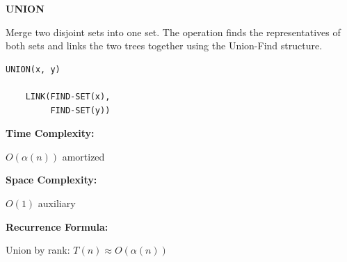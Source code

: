 \documentclass[a4paper,12pt]{article}
\begin{document}
\begin{tcolorbox}[
    colback=gray!30,
    colframe=black,
    boxrule=1pt,
    arc=0mm
]

\begin{tcolorbox}[
    colback=gray!10,
    colframe=black,
    arc=0mm
]
\centering
{\Huge\bfseries UNION}
\end{tcolorbox}


\begin{tcolorbox}[
    colback=gray!10,
    colframe=black,
    arc=0mm
]
\small
Merge two disjoint sets into one set.
The operation finds the representatives of both sets and links the two
trees together using the Union-Find structure.
\end{tcolorbox}


\begin{tcolorbox}[
    colback=black!5,
    colframe=black,
    arc=0mm,
    title=Pseudo-code
]
\tiny
\begin{lstlisting}
UNION(x, y)

    LINK(FIND-SET(x),
         FIND-SET(y))
\end{lstlisting}
\end{tcolorbox}


\begin{tcolorbox}[
    colback=cyan!20,
    colframe=black,
    arc=0mm
]
\small
\textbf{Time Complexity:}

$O(\alpha(n))$ amortized
\end{tcolorbox}


\begin{tcolorbox}[
    colback=violet!20,
    colframe=black,
    arc=0mm
]
\small
\textbf{Space Complexity:}

$O(1)$ auxiliary
\end{tcolorbox}


\begin{tcolorbox}[
    colback=pink!20,
    colframe=black,
    arc=0mm
]
\small
\textbf{Recurrence Formula:}

Union by rank:
$T(n) \approx O(\alpha(n))$
\end{tcolorbox}

\end{tcolorbox}
\end{document}
